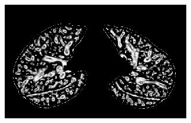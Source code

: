 {\begin{figure}[htbp] 
\centering
\begin{subfigure}{.41\linewidth}%
  \includegraphics[width=\linewidth,trim={{.0\wd0} {.0\wd0} {.0\wd0} {.0\wd0}},clip]{Segmentation/Image/FissureDetection1.jpg} %
  \caption{}
	\label{fig:FissureDetection-a}
\end{subfigure} 
\begin{subfigure}{.408\linewidth}%

\end{subfigure}
\end{figure}}
